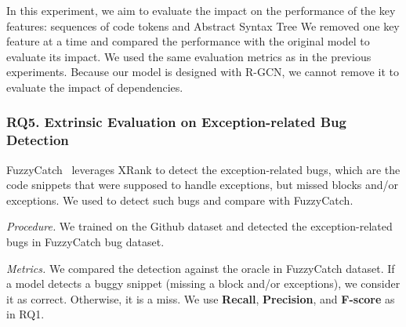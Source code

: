 In this experiment, we aim to evaluate the impact on the performance
of the key features: sequences of code tokens and Abstract Syntax Tree
We removed one key feature at a time and compared the performance with
the original model to evaluate its impact. We used the same evaluation
metrics as in the previous experiments. Because our model is designed
with R-GCN, we cannot remove it to evaluate the impact of dependencies.


\subsubsection{RQ5. Extrinsic Evaluation on Exception-related Bug Detection\\}


 FuzzyCatch~\cite{xrank-fse20} leverages XRank
to detect the exception-related bugs, which are the code snippets that
were supposed to handle exceptions, but missed
 blocks and/or exceptions. We used {\tool} to detect
such bugs and compare with FuzzyCatch.

{\em Procedure.} We trained {\tool} on the Github dataset and detected
the exception-related bugs in FuzzyCatch bug dataset.

{\em Metrics.} We compared the detection against the oracle in
FuzzyCatch dataset. If a model detects a buggy snippet (missing a
 block and/or exceptions), we consider it as correct.
Otherwise, it is a miss. We use {\bf Recall}, {\bf
  Precision}, and {\bf F-score} as in RQ1.
